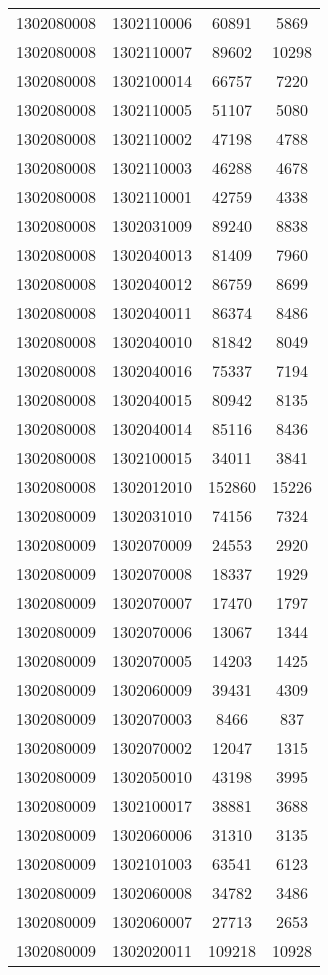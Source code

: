 \begin{longtable}{llcc}
1302080008 & 1302110006 & 60891 & 5869\\
1302080008 & 1302110007 & 89602 & 10298\\
1302080008 & 1302100014 & 66757 & 7220\\
1302080008 & 1302110005 & 51107 & 5080\\
1302080008 & 1302110002 & 47198 & 4788\\
1302080008 & 1302110003 & 46288 & 4678\\
1302080008 & 1302110001 & 42759 & 4338\\
1302080008 & 1302031009 & 89240 & 8838\\
1302080008 & 1302040013 & 81409 & 7960\\
1302080008 & 1302040012 & 86759 & 8699\\
1302080008 & 1302040011 & 86374 & 8486\\
1302080008 & 1302040010 & 81842 & 8049\\
1302080008 & 1302040016 & 75337 & 7194\\
1302080008 & 1302040015 & 80942 & 8135\\
1302080008 & 1302040014 & 85116 & 8436\\
1302080008 & 1302100015 & 34011 & 3841\\
1302080008 & 1302012010 & 152860 & 15226\\
1302080009 & 1302031010 & 74156 & 7324\\
1302080009 & 1302070009 & 24553 & 2920\\
1302080009 & 1302070008 & 18337 & 1929\\
1302080009 & 1302070007 & 17470 & 1797\\
1302080009 & 1302070006 & 13067 & 1344\\
1302080009 & 1302070005 & 14203 & 1425\\
1302080009 & 1302060009 & 39431 & 4309\\
1302080009 & 1302070003 & 8466 & 837\\
1302080009 & 1302070002 & 12047 & 1315\\
1302080009 & 1302050010 & 43198 & 3995\\
1302080009 & 1302100017 & 38881 & 3688\\
1302080009 & 1302060006 & 31310 & 3135\\
1302080009 & 1302101003 & 63541 & 6123\\
1302080009 & 1302060008 & 34782 & 3486\\
1302080009 & 1302060007 & 27713 & 2653\\
1302080009 & 1302020011 & 109218 & 10928\\

\end{longtable}
